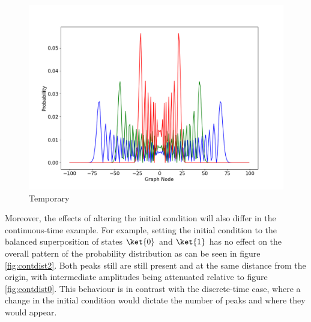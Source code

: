                 \begin{figure}[!h]
                    \centering
                    \includegraphics[scale=0.40]{img/ContQuantumWalk/ctqwMultipleGamma.png}
                    \caption{Temporary} 
                    \label{fig:contdist1}
                \end{figure}
                
            Moreover, the effects of altering the initial condition will also differ in the continuous-time example. For example, setting the initial condition to the balanced superposition of states $\ket{0}$ and $\ket{1}$ has no effect on the overall pattern of the probability distribution as can be seen in figure \ref{fig:contdist2}. Both peaks still are still present and at the same distance from the origin, with intermediate amplitudes being attenuated relative to figure \ref{fig:contdist0}. This behaviour is in contrast with the discrete-time case, where a change in the initial condition would dictate the number of peaks and where they would appear.
            
